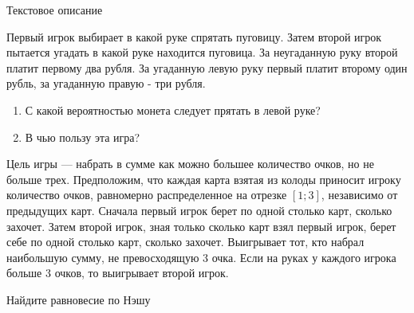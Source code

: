 \begin{problem}
 Текстовое описание \par
Первый игрок выбирает в какой руке спрятать пуговицу. Затем второй
игрок пытается угадать в какой руке находится пуговица. За
неугаданную руку второй платит первому два рубля. За угаданную
левую руку первый платит второму один рубль, за угаданную правую -
три рубля. \par
\begin{enumerate}
\item С какой вероятностью монета следует прятать в левой руке? \par
\item В чью пользу эта игра? \par
\end{enumerate}


\begin{sol}

\end{sol}
\end{problem}




\begin{problem}
\begin{source}
\cite{lones:dtc}\end{source}
Цель игры --- набрать в сумме как можно большее количество очков, но не больше трех. Предположим, что каждая карта взятая из колоды приносит игроку количество очков, равномерно распределенное на отрезке $[1;3]$, независимо от предыдущих карт. Сначала первый игрок берет по одной столько карт, сколько захочет. Затем второй игрок, зная только сколько карт взял первый игрок, берет себе по одной столько карт, сколько захочет. Выигрывает тот, кто набрал наибольшую сумму, не превосходящую 3 очка. Если на руках у каждого игрока больше 3 очков, то выигрывает второй игрок. \par
Найдите равновесие по Нэшу






\begin{sol}

\end{sol}
\end{problem}



